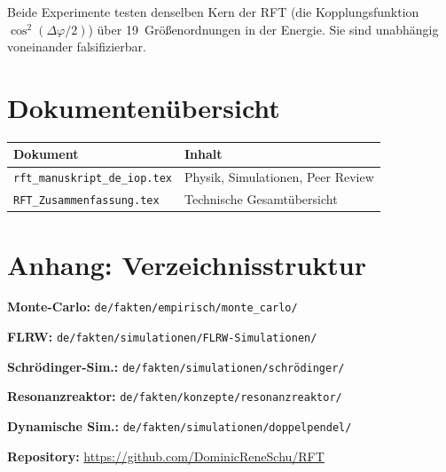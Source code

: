 \documentclass[a4paper,11pt]{article}
\begin{document}
	Beide Experimente testen denselben Kern der RFT
	(die Kopplungsfunktion $\cos^2(\Delta\varphi/2)$) \"uber
	19~Gr\"o\ss{}enordnungen in der Energie. Sie sind
	unabh\"angig voneinander falsifizierbar.
	
	\section*{Dokumenten\"ubersicht}
	
	\begin{center}
		\begin{tabular}{ll}
			\hline
			\textbf{Dokument} & \textbf{Inhalt} \\
			\hline
			\texttt{rft\_manuskript\_de\_iop.tex}
			& Physik, Simulationen, Peer Review \\
			\texttt{RFT\_Zusammenfassung.tex}
			& Technische Gesamt\"ubersicht \\
			\hline
		\end{tabular}
	\end{center}
	
	\section*{Anhang: Verzeichnisstruktur}
	
	\textbf{Monte-Carlo:}
	\texttt{de/fakten/empirisch/monte\_carlo/}
	
	\textbf{FLRW:}
	\texttt{de/fakten/simulationen/FLRW-Simulationen/}
	
	\textbf{Schr\"odinger-Sim.:}
	\texttt{de/fakten/simulationen/schr\"odinger/}
	
	\textbf{Resonanzreaktor:}
	\texttt{de/fakten/konzepte/resonanzreaktor/}
	
	\textbf{Dynamische Sim.:}
	\texttt{de/fakten/simulationen/doppelpendel/}
	
	\vspace{2em}
	
	\textbf{Repository:}
	\url{https://github.com/DominicReneSchu/RFT}
	\hfill
	
\end{document}
